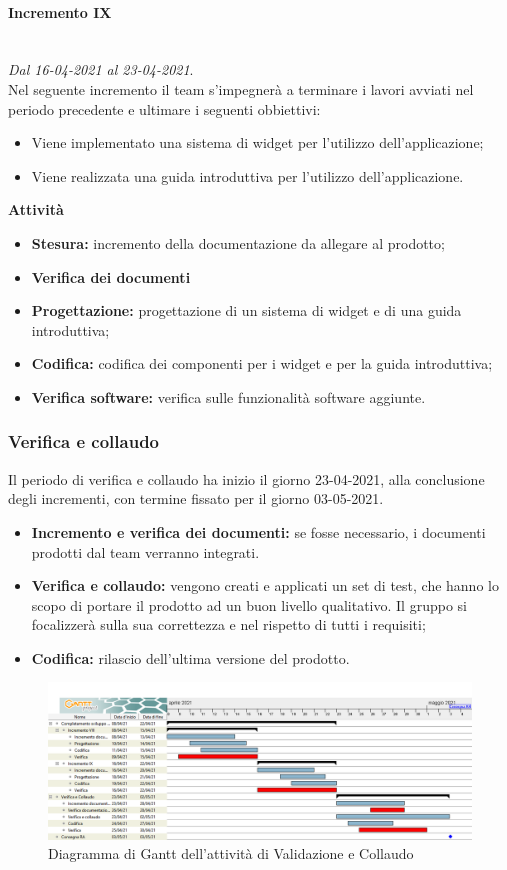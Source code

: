 \paragraph{Incremento IX}\textit{}\\
\textit{Dal 16-04-2021 al 23-04-2021}. \\ 
Nel seguente incremento il team s'impegnerà a terminare i lavori avviati nel periodo precedente e ultimare i seguenti obbiettivi:
\begin{itemize}
	\item Viene implementato una sistema di widget per l'utilizzo dell'applicazione;
	\item Viene realizzata una guida introduttiva per l'utilizzo dell'applicazione.
\end{itemize}			
\textbf{Attività}			
\begin{itemize}
\item \textbf{Stesura:} incremento della documentazione da allegare al prodotto;
\item \textbf{Verifica dei documenti} 
\item \textbf{Progettazione:} progettazione di un sistema di widget e di una guida introduttiva;
\item \textbf{Codifica:} codifica dei componenti per i widget e per la guida introduttiva;
\item \textbf{Verifica software:} verifica sulle funzionalità software aggiunte.
\end{itemize}
\subsubsection{Verifica e collaudo}
Il periodo di verifica e collaudo ha inizio il giorno 23-04-2021, alla conclusione degli incrementi, con termine fissato per il giorno 03-05-2021.
\begin{itemize}
	\item \textbf{Incremento e verifica dei documenti:} se fosse necessario, i documenti prodotti dal team verranno integrati.
	\item \textbf{Verifica e collaudo:} vengono creati e applicati un set di test, che hanno lo scopo di portare il prodotto ad un buon livello qualitativo. Il gruppo si focalizzerà sulla sua correttezza e nel rispetto di tutti i requisiti;
	\item \textbf{Codifica:} rilascio dell'ultima versione del prodotto.
\end{itemize}

\begin{landscape}
\begin{figure}[h]
	\centering
	\includegraphics[width=\linewidth]{Images/GanttPianificazioneValidazioneCollaudo.PNG}
	\caption{Diagramma di Gantt dell'attività di Validazione e Collaudo}
\end{figure}
\end{landscape}



